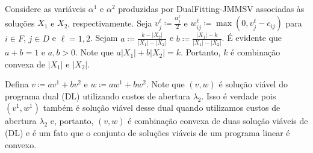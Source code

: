 Considere as variáveis $\alpha^1$ e $\alpha^2$ produzidas por {\sc DualFitting-JMMSV} associadas às soluções $X_1$ e $X_2$, respectivamente. Seja $v_j^\ell \coloneqq \frac{\alpha_j^\ell}{2}$ e $w_{ij}^\ell \coloneqq \max(0,v_j^\ell - c_{ij})$ para $i \in F$, $j \in D$ e $\ell = 1,2$. Sejam $a \coloneqq \frac{k - |X_2|}{|X_1| - |X_2|}$ e $b \coloneqq \frac{|X_1| - k}{|X_1| - |X_2|}$. É evidente que $a + b = 1$ e $a,b >0$. Note que $a|X_1| + b |X_2| = k$. Portanto, $k$ é combinação convexa de $|X_1|$ e $|X_2|$.

Defina $ v \coloneqq av^1 + bv^2$ e $w \coloneqq aw^1 + bw^2$. Note que $(v,w)$ é solução viável do programa dual (DL) utilizando custos de abertura $\lambda_2$. Isso é verdade pois $(v^1,w^1)$ também é solução viável desse dual quando utilizamos custos de abertura $\lambda_2$ e, portanto, $(v,w)$ é combinação convexa de duas solução viáveis de (DL) e é um fato que o conjunto de soluções viáveis de um programa linear é convexo.



